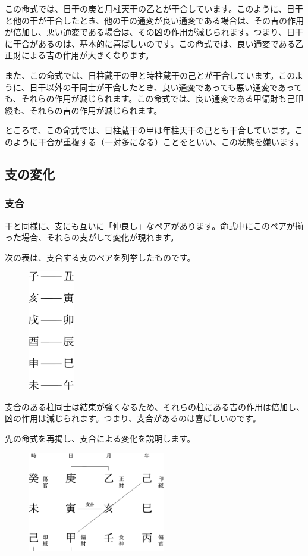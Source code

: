 \documentclass[a5paper,11pt,dvipdfmx]{tarticle}
\begin{document}
この命式では、日干の庚と月柱天干の乙とが干合しています。このように、日干と他の干が干合したとき、他の干の通変が良い通変である場合は、その吉の作用が倍加し、悪い通変である場合は、その凶の作用が減じられます。つまり、日干に干合があるのは、基本的に喜ばしいのです。この命式では、良い通変である乙正財による吉の作用が大きくなります。

また、この命式では、日柱蔵干の甲と時柱蔵干の己とが干合しています。このように、日干以外の干同士が干合したとき、良い通変であっても悪い通変であっても、それらの作用が減じられます。この命式では、良い通変である甲偏財も己印綬も、それらの吉の作用が減じられます。

ところで、この命式では、日柱蔵干の甲は年柱天干の己とも干合しています。このように干合が重複する（一対多になる）ことをといい、この状態を嫌います。

\subsection{支の変化}

\subsubsection*{支合}
干と同様に、支にも互いに「仲良し」なペアがあります。命式中にこのペアが揃った場合、それらの支がして変化が現れます。

次の表は、支合する支のペアを列挙したものです。
\begin{figure}[h]
 \includegraphics[width=20mm,angle=90]{figs/table7-2.eps}
\end{figure}

支合のある柱同士は結束が強くなるため、それらの柱にある吉の作用は倍加し、凶の作用は減じられます。つまり、支合があるのは喜ばしいのです。

先の命式を再掲し、支合による変化を説明します。

\begin{figure}[h]
  \includegraphics[width=60mm,angle=90]{figs/figure7-2.eps}
\end{figure}
\end{document}
